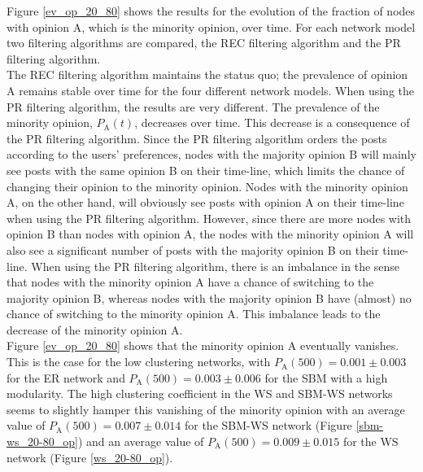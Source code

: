 \documentclass[11 pt , letterpaper , twoside , openright]{book}
\begin{document}
\newline
Figure \ref{ev_op_20_80} shows the results for the evolution of the fraction of nodes with opinion A, which is the minority opinion, over time. For each network model two filtering algorithms are compared, the REC filtering algorithm and the PR filtering algorithm. \\
\newline
The REC filtering algorithm maintains the status quo; the prevalence of opinion A remains stable over time for the four different network models. When using the PR filtering algorithm, the results are very different. The prevalence of the minority opinion, $P_\text{A}(t)$, decreases over time. This decrease is a consequence of the PR filtering algorithm. Since the PR filtering algorithm orders the posts according to the users' preferences, nodes with the majority opinion B will mainly see posts with the same opinion B on their time-line, which limits the chance of changing their opinion to the minority opinion. Nodes with the minority opinion A, on the other hand, will obviously see posts with opinion A on their time-line when using the PR filtering algorithm. However, since there are more nodes with opinion B than nodes with opinion A, the nodes with the minority opinion A will also see a significant number of posts with the majority opinion B on their time-line. When using the PR filtering algorithm, there is an imbalance in the sense that nodes with the minority opinion A have a chance of switching to the majority opinion B, whereas nodes with the majority opinion B have (almost) no chance of switching to the minority opinion A. This imbalance leads to the decrease of the minority opinion A.\\
\newline
Figure \ref{ev_op_20_80} shows that the minority opinion A eventually vanishes. This is the case for the low clustering networks, with $P_\text{A}(500) = 0.001 \pm 0.003$ for the ER network and $P_\text{A}(500) = 0.003 \pm 0.006$ for the SBM with a high modularity. The high clustering coefficient in the WS and SBM-WS networks seems to slightly hamper this vanishing of the minority opinion with an average value of $P_\text{A}(500) = 0.007 \pm 0.014$ for the SBM-WS network (Figure \ref{sbm-ws_20-80_op}) and an average value of $P_\text{A}(500) = 0.009 \pm 0.015$ for the WS network (Figure \ref{ws_20-80_op}).\\ 
\newline
\end{document}
